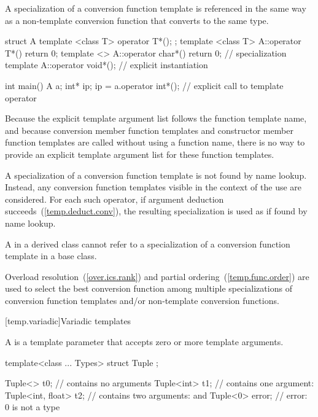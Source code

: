 \pnum
A specialization of a
conversion function template
is referenced in
the same way as a non-template conversion function that converts to
the same type.
\begin{example}

\begin{codeblock}
struct A {
  template <class T> operator T*();
};
template <class T> A::operator T*(){ return 0; }
template <> A::operator char*(){ return 0; }    // specialization
template A::operator void*();                   // explicit instantiation

int main() {
  A a;
  int* ip;
  ip = a.operator int*();       // explicit call to template operator 
}
\end{codeblock}
\end{example}
\begin{note}
Because the explicit template argument list follows the function template
name, and because conversion member function templates and constructor
member function templates are called without using a function name,
there is no way to provide an explicit template argument list for these
function templates.
\end{note}

\pnum
A specialization of a
conversion function template
is not found by name
lookup.
Instead, any
conversion function templates
visible in the
context of the use are considered.
For each such operator, if argument
deduction succeeds~(\ref{temp.deduct.conv}), the resulting specialization is
used as if found by name lookup.

\pnum
A  in a derived class cannot refer to a specialization
of a
conversion function template
in a base class.

\pnum
Overload resolution~(\ref{over.ics.rank}) and partial
ordering~(\ref{temp.func.order}) are used to select the best conversion function
among multiple
specializations of conversion function templates
and/or non-template
conversion functions.

[temp.variadic]{Variadic templates}

\pnum
A  is a template parameter
that accepts zero or more template arguments. \begin{example}

\begin{codeblock}
template<class ... Types> struct Tuple { };

Tuple<> t0;                     //  contains no arguments
Tuple<int> t1;                  //  contains one argument: 
Tuple<int, float> t2;           //  contains two arguments:  and 
Tuple<0> error;                 // error: 0 is not a type
\end{codeblock}

\end{example}

